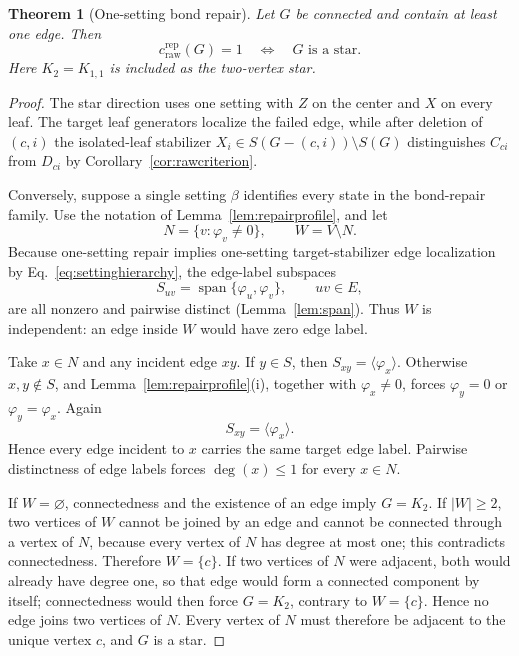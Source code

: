 \documentclass[11pt]{article}
\newtheorem{theorem}{Theorem}[section]
\theoremstyle{remark}
\newcommand{\crep}{c_{\mathrm{raw}}^{\mathrm{rep}}}
\begin{document}
\begin{theorem}[One-setting bond repair]\label{thm:repairone}
Let $G$ be connected and contain at least one edge. Then
\[
\boxed{\crep(G)=1\quad\Longleftrightarrow\quad G\text{ is a star}.}
\]
Here $K_2=K_{1,1}$ is included as the two-vertex star.
\end{theorem}
\begin{proof}
The star direction uses one setting with $Z$ on the center and $X$ on every leaf. The target leaf generators localize the failed edge, while after deletion of $(c,i)$ the isolated-leaf stabilizer $X_i\in S(G-(c,i))\setminus S(G)$ distinguishes $C_{ci}$ from $D_{ci}$ by Corollary~\ref{cor:rawcriterion}.

Conversely, suppose a single setting $\beta$ identifies every state in the bond-repair family. Use the notation of Lemma~\ref{lem:repairprofile}, and let
\[
N=\{v:\varphi_v\neq0\},\qquad W=V\setminus N.
\]
Because one-setting repair implies one-setting target-stabilizer edge localization by Eq.~\eqref{eq:settinghierarchy}, the edge-label subspaces
\[
S_{uv}=\operatorname{span}\{\varphi_u,\varphi_v\},\qquad uv\in E,
\]
are all nonzero and pairwise distinct (Lemma~\ref{lem:span}). Thus $W$ is independent: an edge inside $W$ would have zero edge label.

Take $x\in N$ and any incident edge $xy$. If $y\in S$, then $S_{xy}=\langle\varphi_x\rangle$. Otherwise $x,y\notin S$, and Lemma~\ref{lem:repairprofile}(i), together with $\varphi_x\neq0$, forces $\varphi_y=0$ or $\varphi_y=\varphi_x$. Again
\[
S_{xy}=\langle\varphi_x\rangle.
\]
Hence every edge incident to $x$ carries the same target edge label. Pairwise distinctness of edge labels forces $\deg(x)\le1$ for every $x\in N$.

If $W=\varnothing$, connectedness and the existence of an edge imply $G=K_2$. If $|W|\ge2$, two vertices of $W$ cannot be joined by an edge and cannot be connected through a vertex of $N$, because every vertex of $N$ has degree at most one; this contradicts connectedness. Therefore $W=\{c\}$. If two vertices of $N$ were adjacent, both would already have degree one, so that edge would form a connected component by itself; connectedness would then force $G=K_2$, contrary to $W=\{c\}$. Hence no edge joins two vertices of $N$. Every vertex of $N$ must therefore be adjacent to the unique vertex $c$, and $G$ is a star.
\end{proof}
\end{document}
